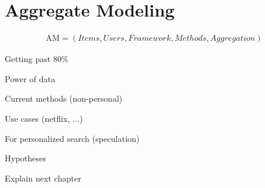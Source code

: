
\section{Aggregate Modeling}

\begin{eqnarray}
  \mathrm{AM} = (Items, Users, Framework, Methods, Aggregation)
\end{eqnarray}

Getting past 80\%

Power of data

Current methods (non-personal)

Use cases (netflix, ...)

For personalized search (speculation)

Hypotheses

Explain next chapter


